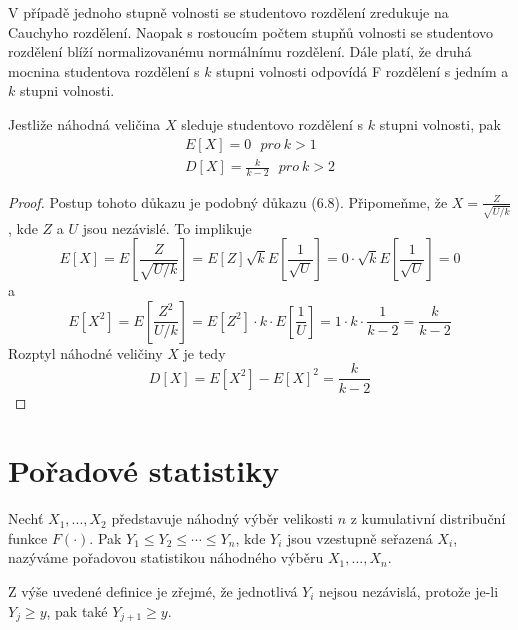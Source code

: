 V případě jednoho stupně volnosti se studentovo rozdělení zredukuje na Cauchyho rozdělení. Naopak s rostoucím počtem stupňů volnosti se studentovo rozdělení blíží normalizovanému normálnímu rozdělení. Dále platí, že druhá mocnina studentova rozdělení s $k$ stupni volnosti odpovídá F rozdělení s jedním a $k$ stupni volnosti.

\begin{definition}
Jestliže náhodná veličina $X$ sleduje studentovo rozdělení s $k$ stupni volnosti, pak
\begin{gather*}
E[X] = 0 ~~~ \textit{pro} ~ k > 1\\
D[X] = \frac{k}{k - 2} ~~~ \textit{pro} ~ k > 2
\end{gather*}
\end{definition}

\begin{proof}
Postup tohoto důkazu je podobný důkazu (6.8). Připomeňme, že $X = \frac{Z}{\sqrt{U / k}}$, kde $Z$ a $U$ jsou nezávislé. To implikuje
\begin{equation*}
E[X] = E\left[\frac{Z}{\sqrt{U/k}}\right] = E[Z]\sqrt{k}E\left[\frac{1}{\sqrt{U}} \right] = 0 \cdot \sqrt{k}E\left[\frac{1}{\sqrt{U}} \right] = 0
\end{equation*}
a
\begin{equation*}
E[X^2] = E\left[\frac{Z^2}{U/k}\right] = E[Z^2] \cdot k \cdot E\left[\frac{1}{U} \right] = 1 \cdot k \cdot \frac{1}{k - 2} = \frac{k}{k - 2}
\end{equation*}
Rozptyl náhodné veličiny $X$ je tedy
\begin{equation*}
D[X] = E[X^2] - E[X]^2 = \frac{k}{k - 2}
\end{equation*}
\end{proof}

\section{Pořadové statistiky}

\begin{definition}
Nechť $X_1, ..., X_2$ představuje náhodný výběr velikosti $n$ z kumulativní distribuční funkce $F(\cdot)$. Pak $Y_1 \le Y_2 \le \cdots \le Y_n$, kde $Y_i$ jsou vzestupně seřazená $X_i$, nazýváme pořadovou statistikou náhodného výběru $X_1, ..., X_n$.
\end{definition}

Z výše uvedené definice je zřejmé, že jednotlivá $Y_i$ nejsou nezávislá, protože je-li $Y_j \ge y$, pak také $Y_{j + 1} \ge y$.

